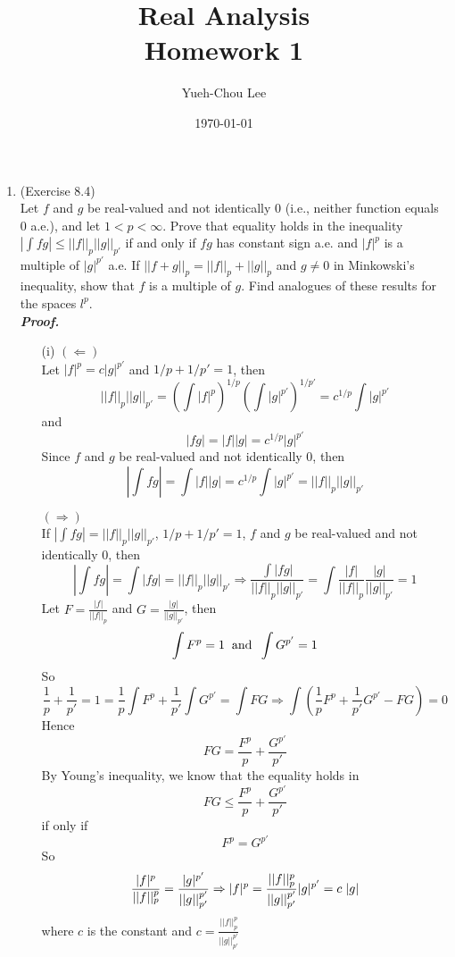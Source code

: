 \documentclass[a4paper,11pt]{article}
\title{Real Analysis \\ Homework 1}
\author{Yueh-Chou Lee}
\date{\today}
\begin{document}
\maketitle
\begin{enumerate}

	\item (Exercise 8.4)\\
		Let $f$ and $g$ be real-valued and not identically 0 (i.e., neither function equals 0 a.e.), and let $1 < p < \infty$. Prove that equality holds in the inequality $|\int fg| \leq ||f||_p ||g||_{p'}$ if and only if $fg$ has constant sign a.e. and $|f|^p$ is a multiple of $|g|^{p'}$ a.e. If $||f+g||_p = ||f||_p + ||g||_p$ and $g \neq 0$ in Minkowski’s inequality, show that $f$ is a multiple of $g$. Find analogues of these results for the spaces $l^p$.\\
	\newline
	\textit{\textbf {Proof.}}\\
	\begin{enumerate}
		\item [(i)]
			$(\Leftarrow)$\\
			Let $|f|^p = c|g|^{p'}$ and $1/p + 1/p' = 1$, then
				$$||f||_p ||g||_{p'}
				= \left( \int |f|^p \right)^{1/p} (\int |g|^{p'})^{1/p'}
				= c^{1/p} \int |g|^{p'}$$
			and
				$$|fg| = |f||g| = c^{1/p}|g|^{p'}$$
			Since $f$ and $g$ be real-valued and not identically 0, then
				$$|\int fg| = \int|f||g| = c^{1/p} \int |g|^{p'} = ||f||_p ||g||_{p'}$$

			$(\Rightarrow)$\\
			If $|\int fg| = ||f||_p ||g||_{p'}$, $1/p + 1/p' = 1$, $f$ and $g$ be real-valued and not identically 0, then
				$$|\int fg| = \int |fg| = ||f||_p ||g||_{p'}
				\Rightarrow \frac{\int |fg|}{||f||_p ||g||_{p'}}
				= \int \frac{|f|}{||f||_p} \frac{|g|}{||g||_{p'}}
				= 1$$
			Let $F = \frac{|f|}{||f||_p}$ and $G = \frac{|g|}{||g||_{p'}}$, then
				$$\int F^p = 1 \hspace{0.2 cm} \text{and} \hspace{0.2cm} \int G^{p'} = 1$$
			So
				$$\frac{1}{p} + \frac{1}{p'} = 1
				= \frac{1}{p} \int F^p + \frac{1}{p'} \int G^{p'}
				= \int FG
				\Rightarrow \int \left( \frac{1}{p} F^p + \frac{1}{p'} G^{p'} - FG \right)
				= 0$$
			Hence
				$$FG = \frac{F^p}{p} + \frac{G^{p'}}{p'}$$
			By Young's inequality, we know that the equality holds in
				$$FG \leq \frac{F^p}{p} + \frac{G^{p'}}{p'}$$
			if only if
				$$F^p = G^{p'}$$
			So
				$$\frac{|f|^p}{||f||_p^p} = \frac{|g|^{p'}}{||g||_{p'}^{p'}}
				\Rightarrow |f|^p = \frac{||f||_p^p}{||g||_{p'}^{p'}}|g|^{p'} = c \hspace{0.1cm} |g|$$
			where $c$ is the constant and $c = \frac{||f||_p^p}{||g||_{p'}^{p'}}$



\end{enumerate}
\end{enumerate}
\end{document}
